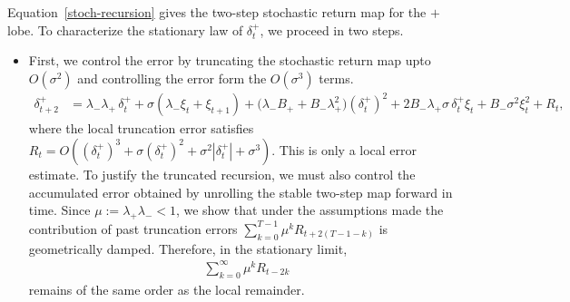 \documentclass{article} %
\theoremstyle{plain}
\theoremstyle{definition}
\begin{document}
Equation~\eqref{stoch-recursion} gives the two-step stochastic return map for
the \(+\) lobe. To characterize the stationary law of \(\delta_t^+\), we proceed
in two steps.

\begin{itemize}[nosep,leftmargin=*]
    \item First, we control the error by truncating the stochastic return
    map upto $O(\sigma^2)$ and controlling the error form the $O(\sigma^3)$ terms. 
    \begin{align}
    \label{stoch-recursion-with-error}
    \delta_{t+2}^+
    &=
    \lambda_-\lambda_+\,\delta_t^+
    +\sigma(\lambda_-\xi_t+\xi_{t+1})
    +\bigl(\lambda_-B_+ + B_-\lambda_+^2\bigr)(\delta_t^+)^2 
    +2B_-\lambda_+\sigma\,\delta_t^+\xi_t
    +B_-\sigma^2\xi_t^2
    +R_t,
    \end{align}
    where the local truncation error satisfies $    R_t
        =
        O\!\left(
        (\delta_t^+)^3
        +\sigma(\delta_t^+)^2
        +\sigma^2|\delta_t^+|
        +\sigma^3
        \right).$
    This is only a local error estimate. To justify the truncated recursion, we
    must also control the accumulated error obtained by unrolling the stable
    two-step map forward in time. Since $\mu:=\lambda_+\lambda_- <1$, we show that under the assumptions made
    the contribution of past truncation errors $ \sum_{k=0}^{T-1}\mu^k R_{t+2(T-1-k)}$ is geometrically damped. 
    Therefore, in the stationary limit,
    \begin{align}
        \sum_{k=0}^{\infty}\mu^k R_{t-2k}
    \end{align}
    remains of the same order as the local remainder.


\end{itemize}
\end{document}

